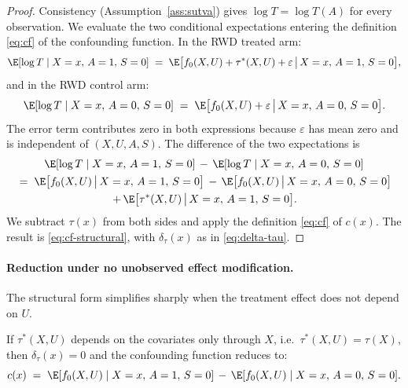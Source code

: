 \begin{proof}
Consistency (Assumption~\ref{ass:sutva}) gives $\log T = \log T(A)$ for every observation.
We evaluate the two conditional expectations entering the definition \eqref{eq:cf} of the confounding function.
In the RWD treated arm:
\begin{equation}
\E[\log T \mid X = x,\, A = 1,\, S = 0] \;=\; \E\bigl[f_0(X, U) + \tau^*(X, U) + \varepsilon \,\big|\, X = x,\, A = 1,\, S = 0\bigr],
\end{equation}
and in the RWD control arm:
\begin{equation}
\E[\log T \mid X = x,\, A = 0,\, S = 0] \;=\; \E\bigl[f_0(X, U) + \varepsilon \,\big|\, X = x,\, A = 0,\, S = 0\bigr].
\end{equation}
The error term contributes zero in both expressions because $\varepsilon$ has mean zero and is independent of $(X, U, A, S)$.
The difference of the two expectations is
\begin{multline}
\E[\log T \mid X = x,\, A = 1,\, S = 0] \,-\, \E[\log T \mid X = x,\, A = 0,\, S = 0] \\
\;=\; \E\bigl[f_0(X, U) \,\big|\, X = x,\, A = 1,\, S = 0\bigr] \,-\, \E\bigl[f_0(X, U) \,\big|\, X = x,\, A = 0,\, S = 0\bigr] \\
\,+\, \E\bigl[\tau^*(X, U) \,\big|\, X = x,\, A = 1,\, S = 0\bigr].
\end{multline}
We subtract $\tau(x)$ from both sides and apply the definition \eqref{eq:cf} of $c(x)$.
The result is \eqref{eq:cf-structural}, with $\delta_\tau(x)$ as in \eqref{eq:delta-tau}.
\end{proof}

\paragraph{Reduction under no unobserved effect modification.}
The structural form simplifies sharply when the treatment effect does not depend on $U$.

\begin{corollary}\label{cor:no-effect-mod}
If $\tau^*(X, U)$ depends on the covariates only through $X$, i.e.\ $\tau^*(X, U) = \tau(X)$, then $\delta_\tau(x) = 0$ and the confounding function reduces to:
\begin{equation}
c(x) \;=\; \E[f_0(X, U) \mid X = x,\, A = 1,\, S = 0] \,-\, \E[f_0(X, U) \mid X = x,\, A = 0,\, S = 0].
\label{eq:cf-baseline}
\end{equation}
\end{corollary}

